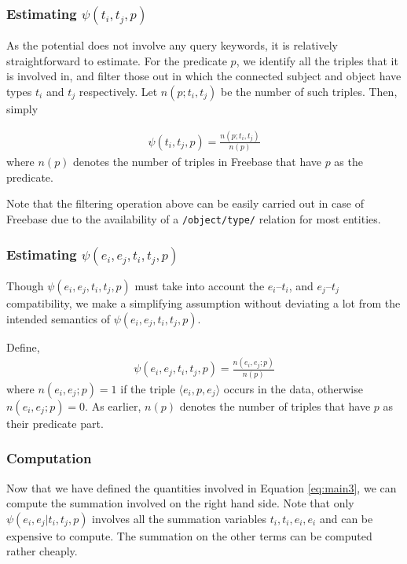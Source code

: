 \documentclass[a4paper, twoside, 12pt]{report}
\begin{document}
\subsubsection{Estimating $\psi(t_i,t_j,p)$}
As the potential does not involve any query keywords, it is relatively straightforward to estimate. For the predicate $p$, we identify all the triples that it is involved in, and filter those out  in which the connected subject and object have types $t_i$ and $t_j$ respectively. Let $n(p; t_i, t_j)$ be the number of such triples. Then, simply

\begin{align}
\psi(t_i,t_j,p) = \frac{n(p; t_i, t_j)}{n(p)}
\end{align}
where $n(p)$ denotes the number of triples in Freebase that have $p$ as the predicate.

Note that the filtering operation above can be easily carried out in case of Freebase due to the availability of a \texttt{/object/type/} relation for most entities.

\subsubsection{Estimating $\psi(e_i,e_j,t_i,t_j,p)$}
Though $\psi(e_i,e_j,t_i,t_j,p)$ must take into account the $e_i$--$t_i$, and $e_j$--$t_j$ compatibility, we make a simplifying assumption without deviating a lot from the intended semantics of $\psi(e_i,e_j,t_i,t_j,p)$.

Define, 
\begin{align}
\psi(e_i,e_j,t_i,t_j,p) = \frac{n(e_i, e_j; p)}{n(p)} \label{eq:psi4}
\end{align}
where $n(e_i, e_j; p) = 1$ if the triple $\langle e_i, p, e_j \rangle$ occurs in the data, otherwise $n(e_i, e_j; p) = 0$. As earlier, $n(p)$ denotes the number of triples that have $p$ as their predicate part.

\subsubsection{Computation}
Now that we have defined the quantities involved in Equation \ref{eq:main3}, we can compute the summation involved on the right hand side. Note that only $\psi(e_i, e_j | t_i, t_j, p)$ involves all the summation variables $t_i, t_i, e_i, e_i$ and can be expensive to compute. The summation on the other terms can be computed rather cheaply.

\end{document}
